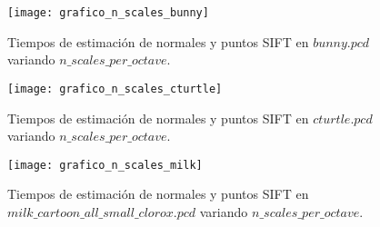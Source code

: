 \begin{figure}[h!]
\centering
\texttt{[image: grafico\_n\_scales\_bunny]}
\caption{Tiempos de estimación de normales y puntos SIFT en $bunny.pcd$ variando $n\_scales\_per\_octave$.}\label{fig:grafico_n_scales_bunny}
\end{figure}

\begin{figure}[h!]
\centering
\texttt{[image: grafico\_n\_scales\_cturtle]}
\caption{Tiempos de estimación de normales y puntos SIFT en $cturtle.pcd$ variando $n\_scales\_per\_octave$.}\label{fig:grafico_n_scales_cturtle}
\end{figure}


\begin{figure}[h!]
\centering
\texttt{[image: grafico\_n\_scales\_milk]}
\caption{Tiempos de estimación de normales y puntos SIFT en $milk\_cartoon\_all\_small\_clorox.pcd$ variando $n\_scales\_per\_octave$.}\label{fig:grafico_n_scales_milk}
\end{figure}


